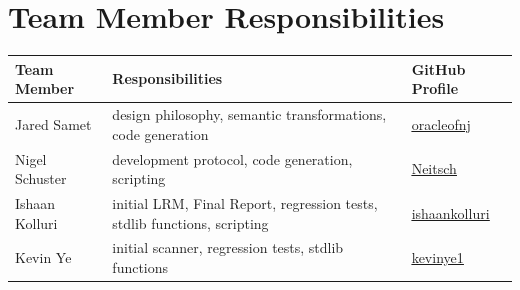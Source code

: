 \section{Team Member Responsibilities}

\begin{tabular}{ | l | l | l |}\hline
  Team Member  & Responsibilities      & GitHub Profile\\ \hline
  Jared Samet & design philosophy, semantic transformations, code generation  & \underline{\href{https://github.com/oracleofnj}{oracleofnj}}\\
  Nigel Schuster & development protocol, code generation, scripting  & \underline{\href{https://github.com/Neitsch}{Neitsch}}\\
  Ishaan Kolluri & initial LRM, Final Report, regression tests, stdlib functions, scripting & \underline{\href{https://github.com/ishaankolluri}{ishaankolluri}}\\
  Kevin Ye & initial scanner, regression tests, stdlib functions & \underline{\href{https://github.com/kevinye1}{kevinye1}}\\ \hline
\end{tabular}

